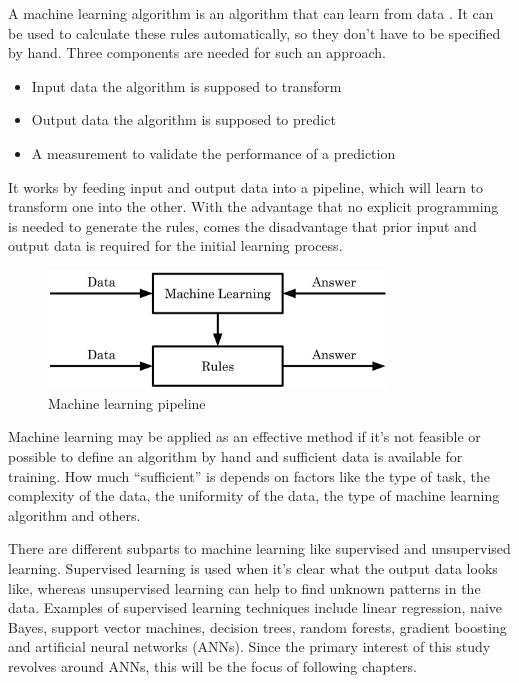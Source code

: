 A machine learning algorithm is an algorithm that can learn from data \cite{Goodfellow2016}. It can be used to calculate these rules automatically, so they don't have to be specified by hand. Three components are needed for such an approach.

\begin{itemize}
\item Input data the algorithm is supposed to transform
\item Output data the algorithm is supposed to predict
\item A measurement to validate the performance of a prediction
\end{itemize}

It works by feeding input and output data into a pipeline, which will learn to transform one into the other. With the advantage that no explicit programming is needed to generate the rules, comes the disadvantage that prior input and output data is required for the initial learning process.

\begin{figure}[H]
\centering
\par
\includegraphics[width=0.8\textwidth]{imgs/ml_pipeline.png}
\caption{Machine learning pipeline}
\par
\end{figure}

Machine learning may be applied as an effective method if it's not feasible or possible to define an algorithm by hand and sufficient data is available for training. How much “sufficient” is depends on factors like the type of task, the complexity of the data, the uniformity of the data, the type of machine learning algorithm and others.

There are different subparts to machine learning like supervised and unsupervised learning. Supervised learning is used when it's clear what the output data looks like, whereas unsupervised learning can help to find unknown patterns in the data. Examples of supervised learning techniques include linear regression, naive Bayes, support vector machines, decision trees, random forests, gradient boosting and artificial neural networks (ANNs). Since the primary interest of this study revolves around ANNs, this will be the focus of following chapters.


